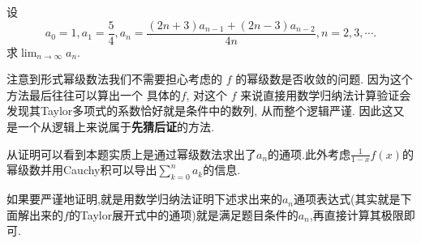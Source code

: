 \documentclass[../../main.tex]{subfiles}%
\begin{document}
\begin{example}
设
\[
a_0=1,a_1=\frac{5}{4},a_n=\frac{(2n+3)a_{n-1}+(2n-3)a_{n-2}}{4n},n=2,3,\cdots.
\]
求$\lim_{n\rightarrow \infty}a_n$.
\end{example}
\begin{note}
注意到形式幂级数法我们不需要担心考虑的 \( f \) 的幂级数是否收敛的问题. 因为这个方法最后往往可以算出一个 具体的\( f \), 对这个 \( f \) 来说直接用数学归纳法计算验证会发现其Taylor多项式的系数恰好就是条件中的数列, 从而整个逻辑严谨. 因此这又是一个从逻辑上来说属于\textbf{先猜后证}的方法.

从证明可以看到本题实质上是通过幂级数法求出了$a_n$的通项.此外考虑$\frac{1}{1-x}f(x)$的幂级数并用Cauchy积可以导出$\sum_{k=0}^n a_k$的信息.

如果要严谨地证明,就是用数学归纳法证明下述求出来的$a_n$通项表达式(其实就是下面解出来的$f$的Taylor展开式中的通项)就是满足题目条件的$a_n$,再直接计算其极限即可.
\end{note}
\end{document}
